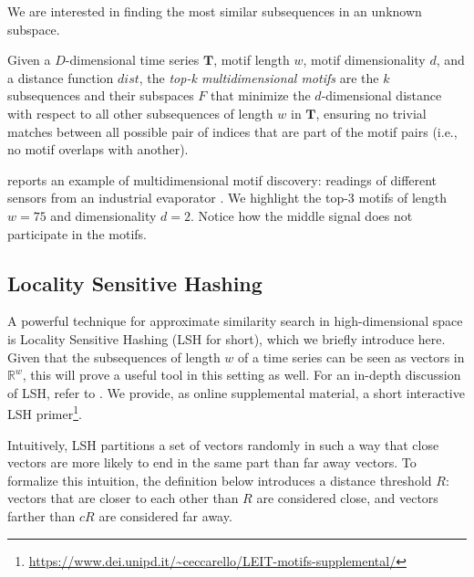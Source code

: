 We are interested in finding the most similar subsequences in an unknown subspace.
\begin{definition}
\textup{Given a $D$-dimensional time series $\mathbf{T}$, motif length $w$, motif dimensionality $d$, and a distance function $dist$, the \textit{top-k multidimensional motifs} are the $k$ subsequences and their subspaces $F$ that minimize the $d$-dimensional distance with respect to all other subsequences of length $w$ in $\mathbf{T}$, ensuring no trivial matches between all possible pair of indices that are part of the motif pairs (i.e., no motif overlaps with another).}
\end{definition}

\begin{example}
     reports an example of multidimensional motif discovery:  readings of different sensors from an industrial evaporator \cite{DaISyEVAP}. We highlight the top-3 motifs of length $w = 75$ and dimensionality $d=2$.
    Notice how the middle signal does not participate in the motifs.
\end{example}

\subsection{Locality Sensitive Hashing}

A powerful technique for approximate similarity search in high-dimensional space is Locality Sensitive Hashing (LSH for short), which we briefly introduce here.
Given that the subsequences of length $w$ of a time series can be seen as vectors in $\mathbb{R}^w$, this will prove a useful tool in this setting as well.
For an in-depth discussion of LSH, refer to \cite{lsh, wang2014hashingsimilaritysearchsurvey}.
We provide, as online supplemental material, a short interactive LSH primer\footnote{\url{https://www.dei.unipd.it/~ceccarello/LEIT-motifs-supplemental/}}.

Intuitively, LSH partitions a set of vectors randomly in such a way that close vectors are more likely to end in the same part than far away vectors.
To formalize this intuition, the definition below introduces a distance threshold $R$:
vectors that are closer to each other than $R$ are considered close, and vectors farther than
$cR$ are considered far away.

